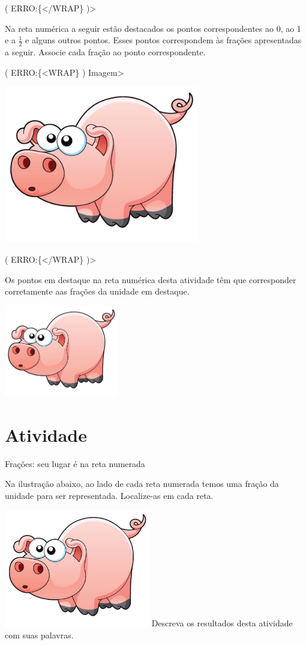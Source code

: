 \documentclass[a4,12pt]{book}
\newcounter{atividade}
\begin{document}
( ERRO:\{</WRAP\} )>



Na reta numérica a seguir estão destacados os pontos correspondentes ao 0, ao 1 e a $\frac{1}{2}$ e alguns outros pontos. Esses pontos correspondem às frações apresentadas a seguir. Associe cada fração ao ponto correspondente.

( ERRO:\{<WRAP\} ) Imagem>

\includegraphics[width=240pt, keepaspectratio]{pig}

( ERRO:\{</WRAP\} )>

Os pontos em destaque na reta numérica desta atividade têm que corresponder corretamente aas frações da unidade em destaque.










\includegraphics[width=\textwidth,height=4cm, keepaspectratio]{pig}
\section{Atividade}



Frações: seu lugar é na reta numerada


Na ilustração abaixo, ao lado de cada reta numerada temos uma fração da unidade para ser representada. Localize-as em cada reta.

\includegraphics[width=180pt, keepaspectratio]{pig}
Descreva os resultados desta atividade com suas palavras.
\end{document}
